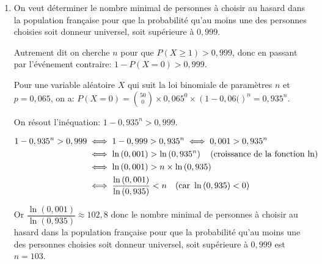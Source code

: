 \begin{enumerate}
\item On veut déterminer le nombre minimal de personnes à choisir au hasard dans la population française pour que la probabilité qu'au moins une des personnes choisies soit donneur universel, soit supérieure à $0,999$.

Autrement dit on cherche $n$ pour que $P\left (X\geqslant 1\right ) > 0,999$, donc en passant par l'événement contraire: $1-P\left (X=0\right ) > 0,999$.

Pour une variable aléatoire $X$ qui suit la loi binomiale de paramètres $n$ et $p=0,065$, on a: $P\left (X=0\right ) = \displaystyle\binom{50}{0} \times 0,065^0 \times \left (1-0,06(\right )^{n}=0,935^n$.

On résout l'inéquation: $1-0,935^n > 0,999$.

$\aligned
1-0,935^n > 0,999
& \iff 1-0,999 > 0,935^n \iff 0,001 > 0,935^n\\
& \iff \ln \left ( 0,001\right ) > \ln \left ( 0,935^n\right ) \quad (\text{croissance de la fonction ln})\\
& \iff \ln \left ( 0,001\right ) > n\times \ln \left ( 0,935\right )\\
& \iff \dfrac{\ln \left ( 0,001\right )}{\ln \left ( 0,935\right )} < n \quad (\text{car }\ln\left (0,935\right )<0)
\endaligned$

Or $\dfrac{\ln \left ( 0,001\right )}{\ln \left ( 0,935\right )} \approx 102,8$ donc  le nombre minimal de personnes à choisir au hasard dans la population française pour que la probabilité qu'au moins une des personnes choisies soit donneur universel, soit supérieure à $0,999$ est $n=103$.
\end{enumerate}

\bigskip

